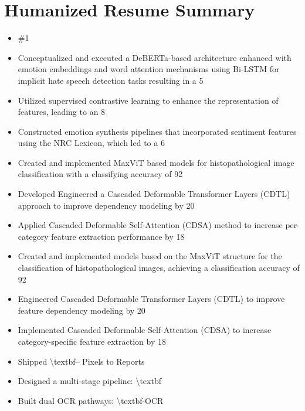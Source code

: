\documentclass[letterpaper,10pt]{article}
\begin{document}
\section*{Humanized Resume Summary}
\begin{itemize}[leftmargin=0.3in]
\item \#1
\item Conceptualized and executed a DeBERTa-based architecture enhanced with emotion embeddings and word attention mechanisms using Bi-LSTM for implicit hate speech detection tasks resulting in a 5\\%
\item Utilized supervised contrastive learning to enhance the representation of features, leading to an 8 \\%
\item Constructed emotion synthesis pipelines that incorporated sentiment features using the NRC Lexicon, which led to a 6\\%
\item Created and implemented MaxViT based models for histopathological image classification with a classifying accuracy of 92\\%
\item Developed Engineered a Cascaded Deformable Transformer Layers (CDTL) approach to improve dependency modeling by 20\\%
\item Applied Cascaded Deformable Self-Attention (CDSA) method to increase per-category feature extraction performance by 18\\%
\item Created and implemented models based on the MaxViT structure for the classification of histopathological images, achieving a classification accuracy of 92\\%
\item Engineered Cascaded Deformable Transformer Layers (CDTL) to improve feature dependency modeling by 20\\%
\item Implemented Cascaded Deformable Self-Attention (CDSA) to increase category-specific feature extraction by 18\\%
\item Shipped \textbackslash textbf\VISDOM – Pixels to Reports
\item Designed a multi-stage pipeline: \textbackslash textbf
\item Built dual OCR pathways: \textbackslash textbf\YOLO-OCR
\end{itemize}
\end{document}
